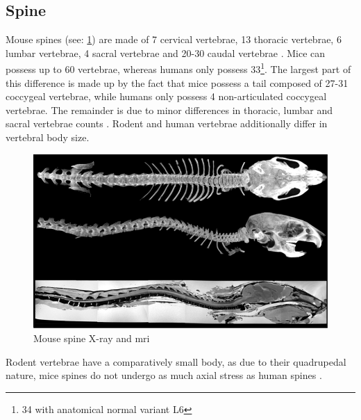 \subsection{Spine}
\label{s:b-mouse-spine}
Mouse spines (see: \cref{fig:mouseSpine}) are made of 7 cervical vertebrae, 13 thoracic vertebrae, 6 lumbar vertebrae, 4 sacral vertebrae and 20-30 caudal vertebrae \cite{platzerTaschenatlasAnatomieBd2013}.
Mice can possess up to 60 vertebrae, whereas humans only possess 33\footnote{34 with anatomical normal variant L6}.
The largest part of this difference is made up by the fact that mice possess a tail composed of 27-31 coccygeal vertebrae,
while humans only possess 4 non-articulated coccygeal vertebrae.
The remainder is due to minor differences in thoracic, lumbar and sacral vertebrae counts \cite{ruberteMorphologicalMousePhenotyping2017,jeromeSkeletalSystem2018,harrisonVertebralLandmarksIdentification2013}.
Rodent and human vertebrae additionally differ in vertebral body size.
\begin{figure}[h]
	\centerline{
		\includegraphics[scale=0.6]{images/mouseSpine.png}}
	\caption{Mouse spine X-ray and \acrshort{mri} \cite{harrisonVertebralLandmarksIdentification2013}}\label{fig:mouseSpine}
\end{figure}

\noindent
Rodent vertebrae have a comparatively small body, as due to their quadrupedal nature,
mice spines do not undergo as much axial stress as human spines \cite{ruberteMorphologicalMousePhenotyping2017,jeromeSkeletalSystem2018,platzerTaschenatlasAnatomieBd2013}.

